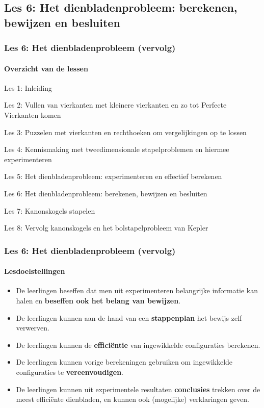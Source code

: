 \documentclass[dutch]{beamer}
\begin{document}



\subsection{Les 6: Het dienbladenprobleem: berekenen, bewijzen en besluiten}
\begin{frame}
\frametitle{Les 6: Het dienbladenprobleem {\small (vervolg)}}
\framesubtitle{Overzicht van de lessen}
\begin{list}{\quad}{}
\item Les 1: Inleiding
\item Les 2: Vullen van vierkanten met kleinere vierkanten en zo tot Perfecte Vierkanten komen
\item Les 3: Puzzelen met vierkanten en rechthoeken om vergelijkingen op te lossen
\item Les 4: Kennismaking met tweedimensionale stapelproblemen en hiermee experimenteren
\item Les 5: Het dienbladenprobleem: experimenteren en effectief berekenen
\item {\color{blue}Les 6: Het dienbladenprobleem: berekenen, bewijzen en besluiten}
\item Les 7: Kanonskogels stapelen
\item Les 8: Vervolg kanonskogels en het bolstapelprobleem van Kepler
\end{list}
\end{frame}

\begin{frame}
\frametitle{Les 6: Het dienbladenprobleem {\small (vervolg)}}
\framesubtitle{Lesdoelstellingen}
\begin{itemize}
\item De leerlingen beseffen dat men uit experimenteren belangrijke informatie kan halen en \textbf{beseffen ook het belang van bewijzen}.
\item De leerlingen kunnen aan de hand van een \textbf{stappenplan} het bewijs zelf verwerven.
\item De leerlingen kunnen de \textbf{effici\"{e}ntie} van ingewikkelde configuraties berekenen.
\item De leerlingen kunnen vorige berekeningen gebruiken om ingewikkelde configuraties te \textbf{vereenvoudigen}.
\item De leerlingen kunnen uit experimentele resultaten \textbf{conclusies} trekken over de meest effici\"{e}nte dienbladen, en kunnen ook (mogelijke) verklaringen geven.
\end{itemize}
\end{frame}
\end{document}
